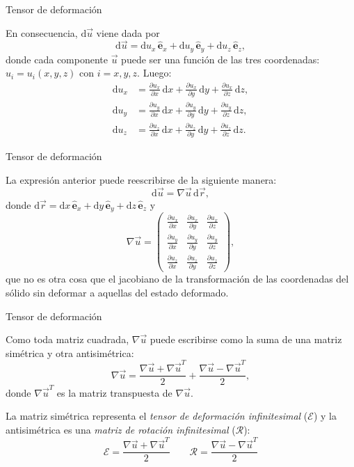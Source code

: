 \documentclass[11pt,handout,aspectratio=1610]{beamer}
\newcommand{\diff}[0]{\text{d}}
\newcommand{\pdiff}[2]{\frac{\partial #1}{\partial #2}}
\newcommand{\ver}[1]{\hat{\mathbf{#1}}}
\newcommand{\vs}{\vspace{11pt}}
\begin{document}
\begin{frame}{Tensor de deformación}

    En consecuencia, $\diff \vec{u}$ viene dada por $$ \diff \vec{u} = \diff u_x \, \ver{e}_x + \diff u_y \, \ver{e}_y + \diff u_z \, \ver{e}_z, $$ donde cada componente $\vec{u}$ puede ser una función de las tres coordenadas: $u_i = u_i (x,y,z)$ con $i = x,y,z$. Luego:
    \begin{align*}
        \diff u_x &= \pdiff{u_x}{x} \, \diff{x} + \pdiff{u_x}{y} \, \diff y + \pdiff{u_x}{z} \, \diff z, \\
        \diff u_y &= \pdiff{u_y}{x} \, \diff{x} + \pdiff{u_y}{y} \, \diff y + \pdiff{u_y}{z} \, \diff z, \\
        \diff u_z &= \pdiff{u_z}{x} \, \diff{x} + \pdiff{u_z}{y} \, \diff y + \pdiff{u_z}{z} \, \diff z.
    \end{align*}

\end{frame}

\begin{frame}{Tensor de deformación}

    La expresión anterior puede reescribirse de la siguiente manera: $$ \diff \vec{u} = \nabla \vec{u} \, \diff \vec{r},$$ donde $\diff \vec{r} = \diff x \, \ver{e}_x  + \diff y \, \ver{e}_y + \diff z \, \ver{e}_z$ y 
    $$ \nabla \vec{u} = \begin{pmatrix}
        \pdiff{u_x}{x} & \pdiff{u_x}{y} & \pdiff{u_x}{z} \\
        \pdiff{u_y}{x} & \pdiff{u_y}{y} & \pdiff{u_y}{z} \\
        \pdiff{u_z}{x} & \pdiff{u_z}{y} & \pdiff{u_z}{z}
    \end{pmatrix}, $$ que no es otra cosa que el jacobiano de la transformación de las coordenadas del sólido sin deformar a aquellas del estado deformado.

\end{frame}

\begin{frame}{Tensor de deformación}

    Como toda matriz cuadrada, $\nabla \vec{u}$ puede escribirse como la suma de una matriz simétrica y otra antisimétrica: $$ \nabla \vec{u} = \frac{\nabla \vec{u} + \nabla \vec{u}^{T}}{2} + \frac{\nabla \vec{u} - \nabla \vec{u}^{T}}{2}, $$ donde $\nabla \vec{u}^{T}$ es la matriz transpuesta de $\nabla \vec{u}$.

    \vs 

    La matriz simétrica representa el \emph{tensor de deformación infinitesimal} ($\mathcal{E}$) y la antisimétrica es una \emph{matriz de rotación infinitesimal} ($\mathcal{R}$): $$ \mathcal{E} = \frac{\nabla \vec{u} + \nabla \vec{u}^{T}}{2} \qquad \mathcal{R} = \frac{\nabla \vec{u} - \nabla \vec{u}^{T}}{2} $$

\end{frame}
\end{document}
